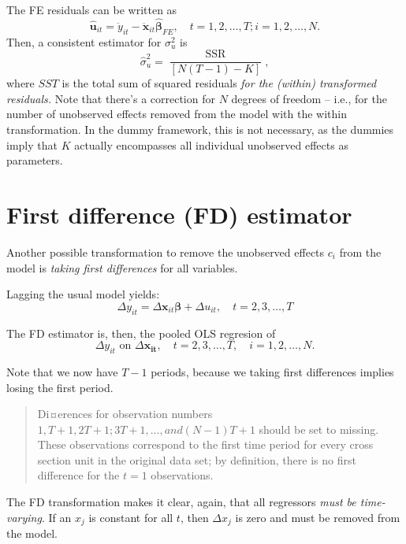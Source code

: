 \documentclass[11pt, a4paper]{report}
\theoremstyle{plain}
\theoremstyle{plain}
\theoremstyle{remark}
\begin{document}
The FE residuals can be written as
$$\hat{\boldsymbol{u}}_{i t}=\ddot{y}_{i t}-\ddot{\mathbf{x}}_{i t} \hat{\boldsymbol{\beta}}_{F E}, \quad t=1,2, \ldots, T ; i=1,2, \ldots, N.$$
Then, a consistent estimator for $\sigma_u^2$ is
\begin{equation}
    \hat{\sigma}_{u}^{2}=\dfrac{\operatorname{SSR}}{[N(T-1)-K]},
    \end{equation}
where $SST$ is the total sum of squared residuals \textit{for the (within) transformed residuals.} Note that there's a correction for $N$ degrees of freedom -- i.e., for the number of unobserved effects removed from the model with the within transformation. In the dummy framework, this is not necessary, as the dummies imply that $K$ actually encompasses all individual unobserved effects as parameters. 



\section{First difference (FD) estimator}

Another possible transformation to remove the unobserved effects $c_i$ from the model is \textit{taking first differences} for all variables.



Lagging the usual model yields:
\begin{equation}
    \Delta y_{i t}=\Delta \mathbf{x}_{i t} \boldsymbol{\beta}+\Delta u_{i t}, \quad t=2,3, \ldots, T
\end{equation}

The FD estimator is, then, the pooled OLS regresion of 
$$\Delta y_{it} \, \, \mathrm{on} \, \, \Delta\mathbf{x_{it}}, \quad t=2,3, \ldots, T, \quad i = 1,2,\ldots, N.$$

Note that we now have $T-1$ periods, because we taking first differences implies losing the first period. 
\begin{quote}
Di¤erences for observation numbers $1, T + 1, 2T + 1;
3T + 1,..., and (N-1)T+1$ should be set to missing. These observations correspond to the first time period for every cross section unit in the original data set; by
definition, there is no first difference for the $t = 1$ observations.
\end{quote}

The FD transformation makes it clear, again, that all regressors \textit{must be time-varying}. If an $x_j$ is constant for all $t$, then $\Delta x_j$ is zero and must be removed from the model. 
\end{document}

